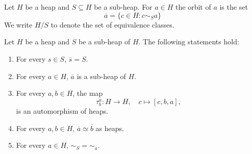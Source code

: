 \documentclass{svmult}
\begin{document}
\section{}

Let $H$ be a heap and $S\subseteq H$ be a sub-heap. For $a\in H$ 
the orbit of $a$ is the set
\[
\overline{a}=\{c\in H:c\sim_S a\}
\]
We write $H/S$ to denote the set
of equivalence classes.

\begin{theorem}
    Let $H$ be a heap and $S$ be a sub-heap of $H$. The following statements hold:
    \begin{enumerate}
        \item For every $s\in S$, $\overline{s}=S$. 
        \item For every $a\in H$, $\overline{a}$ is a sub-heap of $H$.
        \item For every $a,b\in H$, 
        the map
        \[
        \tau_b^a\colon H\to H,\quad
        c\mapsto [c,b,a],
        \]
        is an automorphism of heaps. 
        \item For every $a,b\in H$, 
        $\overline{a}\simeq\overline{b}$ as heaps. 
        \item For every $a\in H$, $\sim_S=\sim_{\overline{a}}$. 
    \end{enumerate}
\end{theorem}
\end{document}
